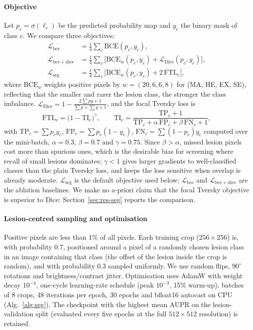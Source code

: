 \paragraph{Objective} Let $p_c=\sigma(\ell_c)$ be the predicted probability map and $y_c$ the binary mask of class $c$. We compare three objectives:
\begin{align}
\mathcal L_{\mathrm{bce}} &= \tfrac14\textstyle\sum_{c}\mathrm{BCE}(p_c,y_c),\\
\mathcal L_{\mathrm{bce+dice}} &= \tfrac14\textstyle\sum_{c}\big[\mathrm{BCE}_w(p_c,y_c) + \mathcal L_{\mathrm{Dice}}(p_c,y_c)\big],\\
\mathcal L_{\mathrm{seg}} &= \tfrac14\textstyle\sum_{c}\big[\mathrm{BCE}_w(p_c,y_c) + 2\,\mathrm{FTL}_c\big],
\end{align}
where $\mathrm{BCE}_w$ weights positive pixels by $w=(20,6,6,8)$ for (MA, HE, EX, SE), reflecting that the smaller and rarer the lesion class, the stronger the class imbalance. $\mathcal L_{\mathrm{Dice}}=1-\frac{2\sum p y+1}{\sum p+\sum y+1}$, and the focal Tversky loss \citep{abraham2019ftl,salehi2017tversky} is
\begin{equation}
\mathrm{FTL}_c=\Big(1-\mathrm{TI}_c\Big)^{\gamma},\qquad \mathrm{TI}_c=\frac{\mathrm{TP}_c+1}{\mathrm{TP}_c+\alpha\,\mathrm{FP}_c+\beta\,\mathrm{FN}_c+1},
\label{eq:ftl}
\end{equation}
with $\mathrm{TP}_c=\sum p_c y_c$, $\mathrm{FP}_c=\sum p_c(1-y_c)$, $\mathrm{FN}_c=\sum(1-p_c)y_c$ computed over the mini-batch, $\alpha=0.3$, $\beta=0.7$ and $\gamma=0.75$. Since $\beta>\alpha$, missed lesion pixels cost more than spurious ones, which is the desirable bias for screening where recall of small lesions dominates; $\gamma<1$ gives larger gradients to well-classified classes than the plain Tversky loss, and keeps the loss sensitive when overlap is already moderate. $\mathcal L_{\mathrm{seg}}$ is the default objective used below; $\mathcal L_{\mathrm{bce}}$ and $\mathcal L_{\mathrm{bce+dice}}$ are the ablation baselines. We make no a-priori claim that the focal Tversky objective is superior to Dice: Section~\ref{sec:res-seg} reports the comparison.

\paragraph{Lesion-centred sampling and optimisation} Positive pixels are less than 1\% of all pixels. Each training crop ($256\times256$) is, with probability 0.7, positioned around a pixel of a randomly chosen lesion class in an image containing that class (the offset of the lesion inside the crop is random), and with probability 0.3 sampled uniformly. We use random flips, $90^\circ$ rotations and brightness/contrast jitter. Optimisation uses AdamW \citep{loshchilov2019adamw} with weight decay $10^{-4}$, one-cycle learning-rate schedule (peak $10^{-3}$, 15\% warm-up), batches of 8 crops, 48 iterations per epoch, 30 epochs and bfloat16 autocast on CPU (Alg.~\ref{alg:seg}). The checkpoint with the highest mean AUPR on the lesion-validation split (evaluated every five epochs at the full $512\times512$ resolution) is retained.

